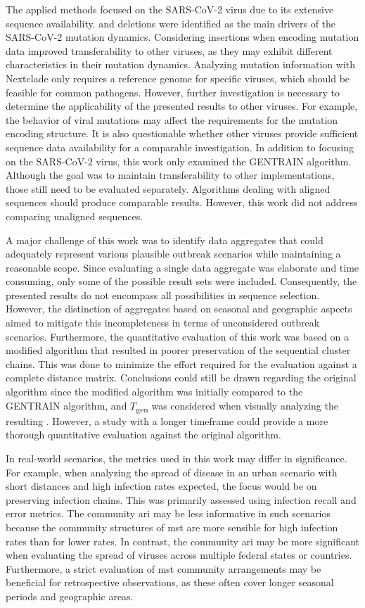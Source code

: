 The applied methods focused on the SARS-CoV-2 virus due to its extensive sequence availability.  and deletions were identified as the main drivers of the SARS-CoV-2 mutation dynamics. Considering insertions when encoding mutation data improved transferability to other viruses, as they may exhibit different characteristics in their mutation dynamics. Analyzing mutation information with Nextclade only requires a reference genome for specific viruses, which should be feasible for common pathogens. However, further investigation is necessary to determine the applicability of the presented results to other viruses. For example, the behavior of viral mutations may affect the requirements for the mutation encoding structure. It is also questionable whether other viruses provide sufficient sequence data availability for a comparable investigation. In addition to focusing on the SARS-CoV-2 virus, this work only examined the GENTRAIN algorithm. Although the goal was to maintain transferability to other implementations, those still need to be evaluated separately. Algorithms dealing with aligned sequences should produce comparable results. However, this work did not address comparing unaligned sequences.

A major challenge of this work was to identify data aggregates that could adequately represent various plausible outbreak scenarios while maintaining a reasonable scope. Since evaluating a single data aggregate was elaborate and time consuming, only some of the possible result sets were included. Consequently, the presented results do not encompass all possibilities in sequence selection. However, the distinction of aggregates based on seasonal and geographic aspects aimed to mitigate this incompleteness in terms of unconsidered outbreak scenarios. Furthermore, the quantitative evaluation of this work was based on a modified algorithm that resulted in poorer preservation of the sequential cluster chains. This was done to minimize the effort required for the evaluation against a complete distance matrix. Conclusions could still be drawn regarding the original algorithm since the modified algorithm was initially compared to the GENTRAIN algorithm, and $T$\textsubscript{gen} was considered when visually analyzing the resulting . However, a study with a longer timeframe could provide a more thorough quantitative evaluation against the original algorithm.

In real-world scenarios, the metrics used in this work may differ in significance. For example, when analyzing the spread of disease in an urban scenario with short distances and high infection rates expected, the focus would be on preserving infection chains. This was primarily assessed using infection recall and error metrics. The community \acrshort{ari} may be less informative in such scenarios because the community structures of \acrshort{mst} are more sensible for high infection rates than for lower rates. In contrast, the community \acrshort{ari} may be more significant when evaluating the spread of viruses across multiple federal states or countries. Furthermore, a strict evaluation of \acrshort{mst} community arrangements may be beneficial for retrospective observations, as these often cover longer seasonal periods and geographic areas.

